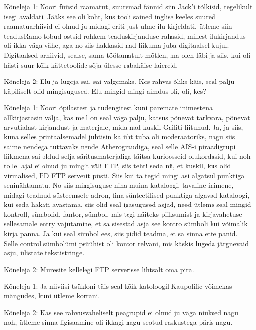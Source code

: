 Kõneleja 1:
Noori füüsid raamatut, suuremad fännid siin Jack'i tõlkisid, tegelikult isegi avaldati.
Jääks see oli koht, kus tooli sained inglise keeles suured raamatuarhiivid ei olnud ju midagi eriti just ulme ilu kirjeldati, ütleme siin teadusRamo tobud ostsid rohkem teaduskirjanduse rahasid, millest ilukirjandus oli ikka väga vähe, aga no siis hakkasid nad liikuma juba digitaalsel kujul. Digitaalsed arhiivid, sealse, sama töötamatult mõtlen, ma olen läbi ja siis, kui oli hästi suur kõik kättetoolide sõja ülesse rabakäise laiereid.
                 
Kõneleja 2:
Elu ja lugeja sai, sai valgemaks.
Kes rahvas õliks käis, seal palju käpiliselt olid mingisugused.
Elu mingid mingi aimdus oli, oli, kes?
                 
Kõneleja 1:
Noori õpilastest ja tudengitest kuni paremate inimestena allkirjastasin välja, kas meil on seal väga palju, katsus põnevat tarkvara, põnevat arvutialast kirjandust ja materjale, mida nad kuskil Gailiti liitunud. Ja, ja siis, kuna selles printaalsemadel juhtisin ka üht tuba oli moderaatoriks, nagu siis saime nendega tuttavaks nende Atherograudiga, seal selle AIS-i piraadigrupi liikmena sai oldud selja säritusmaterjaliga täitsa kurioosseid olukordasid, kui noh tollel ajal ei olnud ju mingit väli FTP, siis tehti seda nii, et kuskil, kus olid virmalised, PD FTP serverit püsti. Siis kui ta tegid mingi asi algatsul punktiga seninähtamatu. No siis mingisuguse nina muina kataloogi, tavaline inimene, midagi teadnud süsteemsete adron, fina sünteetilised punktiga algavad kataloogi, kui seda hakati avastama, siis olid seal igasugused asjad, need ütleme seal mingid kontroll, sümbolid, fantor, sümbol, mis tegi näiteks piiksumist ja kirjavahetuse sellesamale entry vajutamine, et sa sisestad asja see kontro sümboli kui võimalik kirja panna. Ja kui seal sümbol ees, siis pidid teadma, et sa sinna ette panid. Selle control sümbolümi psüühist oli kontor relvani, mis käskis lugeda järgnevaid asju, ülistate tekstistringe.
                 
Kõneleja 2:
Muresite kellelegi FTP serverisse lihtsalt oma pira.
                 
Kõneleja 1:
Ja niiviisi tsükloni täis seal kõik katoloogil Kaupolific võimekas mängudes, kuni ütleme korrani.
                 
Kõneleja 2:
Kas see rahvusvaheliselt peagrupid ei olnud ju väga niuksed nagu noh, ütleme sinna ligisaamine oli ikkagi nagu seotud raskustega päris nagu.
                 
